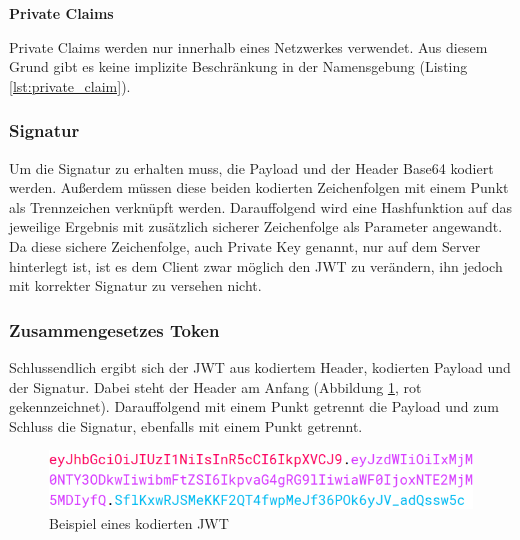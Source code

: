 \noindent
\textbf{Private Claims}

Private Claims werden nur innerhalb eines Netzwerkes verwendet. Aus diesem Grund gibt es keine implizite Beschränkung in der Namensgebung (Listing \ref{lst:private_claim}).

\begin{minipage}{\linewidth}
	

	
\end{minipage}

\subsubsection{Signatur}
\label{sec: jwt_signature}

Um die Signatur zu erhalten muss, die Payload und der Header Base64 kodiert werden. Au{\ss}erdem müssen diese beiden kodierten Zeichenfolgen mit einem Punkt als Trennzeichen verknüpft werden. Darauffolgend wird eine Hashfunktion auf das jeweilige Ergebnis mit zusätzlich sicherer Zeichenfolge als Parameter angewandt. Da diese sichere Zeichenfolge, auch Private Key genannt, nur auf dem Server hinterlegt ist, ist es dem Client zwar möglich den \gls{JWT} zu verändern, ihn jedoch mit korrekter Signatur zu versehen nicht.

\subsubsection{Zusammengesetzes Token}
\label{sec: jwt_result}
Schlussendlich ergibt sich der \gls{JWT} aus kodiertem Header, kodierten Payload und der Signatur. Dabei steht der Header am Anfang (Abbildung \ref{fig:jwt-encoded}, rot gekennzeichnet). Darauffolgend mit einem Punkt getrennt die Payload und zum Schluss die Signatur, ebenfalls mit einem Punkt getrennt.

\begin{figure}[h]
	\centering
	\includegraphics[width=\linewidth]{graphics/jwt-encoded.png}
	\caption{Beispiel eines kodierten \gls{JWT} }
	\label{fig:jwt-encoded}
\end{figure}

